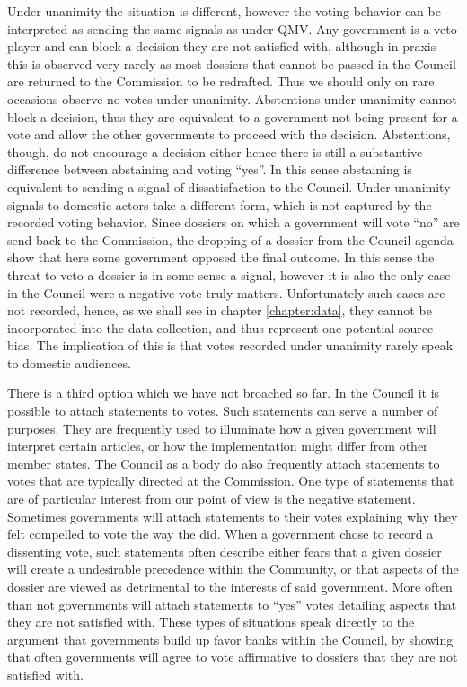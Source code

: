 Under unanimity the situation is different, however the voting behavior can be interpreted as sending the same signals as under QMV. Any government is a veto player and can block a decision they are not satisfied with, although in praxis this is observed very rarely as most dossiers that cannot be passed in the Council are returned to the Commission to be redrafted. Thus we should only on rare occasions observe no votes under unanimity. Abstentions under unanimity cannot block a decision, thus they are equivalent to a government not being present for a vote and allow the other governments to proceed with the decision. Abstentions, though, do not encourage a decision either hence there is still a substantive difference between abstaining and voting ``yes''. In this sense abstaining is equivalent to sending a signal of dissatisfaction to the Council. Under unanimity signals to domestic actors take a different form, which is not captured by the recorded voting behavior. Since dossiers on which a government will vote ``no'' are send back to the Commission, the dropping of a dossier from the Council agenda show that here some government opposed the final outcome. In this sense the threat to veto a dossier is in some sense a signal, however it is also the only case in the Council were a negative vote truly matters. Unfortunately such cases are not recorded, hence, as we shall see in chapter \ref{chapter:data}, they cannot be incorporated into the data collection, and thus represent one potential source bias. The implication of this is that votes recorded under unanimity rarely speak to domestic audiences. 

There is a third option which we have not broached so far. In the Council it is possible to attach statements to votes. Such statements can serve a number of purposes. They are frequently used to illuminate how a given government will interpret certain articles, or how the implementation might differ from other member states. The Council as a body do also frequently attach statements to votes that are typically directed at the Commission. One type of statements that are of particular interest from our point of view is the negative statement. Sometimes governments will attach statements to their votes explaining why they felt compelled to vote the way the did. When a government chose to record a dissenting vote, such statements often describe either fears that a given dossier will create a undesirable precedence within the Community, or that aspects of the dossier are viewed as detrimental to the interests of said government. More often than not governments will attach statements to ``yes'' votes detailing aspects that they are not satisfied with. These types of situations speak directly to the argument that governments build up favor banks within the Council, by showing that often governments will agree to vote affirmative to dossiers that they are not satisfied with. 

